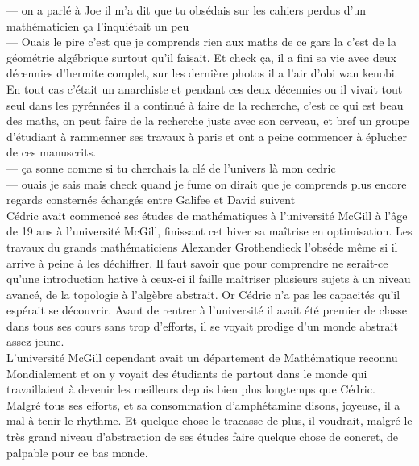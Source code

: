 \documentclass{article}
\begin{document}
---  on a parlé  à Joe il m'a dit que tu obsédais sur les cahiers perdus d'un mathématicien
ça l'inquiétait un peu\\
--- Ouais le pire c'est que je comprends rien aux maths de ce gars la c'est de la géométrie algébrique
surtout qu'il faisait. Et check ça, il a fini sa vie avec deux décennies d'hermite complet, sur les
dernière photos il a l'air d'obi wan kenobi. En tout cas c'était un anarchiste et pendant ces
deux décennies ou il vivait tout seul dans les pyrénnées il a continué à faire de la recherche,
c'est ce qui est beau des maths, on peut faire de la recherche juste avec son cerveau, et bref
un groupe d'étudiant à rammenner ses travaux à paris et ont a peine commencer à
éplucher de ces manuscrits.\\
--- ça sonne comme si tu cherchais la clé de l'univers là mon cedric\\
--- ouais je sais mais check quand je fume on dirait que je comprends plus encore\\

regards consternés échangés entre Galifee et David suivent\\



Cédric avait commencé ses études de mathématiques à l'université McGill à l'âge
de 19 ans à l'université McGill, finissant cet hiver sa maîtrise en
optimisation. Les travaux du grands mathématiciens Alexander Grothendieck
l'obséde même si il arrive à peine à les déchiffrer. Il faut savoir
que pour comprendre ne serait-ce qu'une introduction hative à ceux-ci il faille
maîtriser plusieurs sujets à un niveau avancé, de la topologie à l'algèbre
abstrait. Or Cédric n'a pas les capacités qu'il espérait se découvrir. Avant de
rentrer à l'université il avait été premier de classe dans tous ses cours sans
trop d'efforts, il se voyait prodige d'un monde abstrait assez jeune.\\

L'université McGill cependant avait un département de Mathématique reconnu
Mondialement et on y voyait des étudiants de partout dans le monde qui
travaillaient à devenir les meilleurs depuis bien plus longtemps que Cédric.
Malgré tous ses efforts, et sa consommation d'amphétamine disons, joyeuse, il a
mal à tenir le rhythme. Et quelque chose le tracasse de plus, il voudrait,
malgré le très grand niveau d'abstraction de ses études faire quelque chose de
concret, de palpable pour ce bas monde.\\
\end{document}

